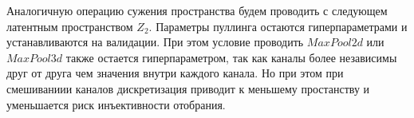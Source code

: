Аналогичную операцию сужения пространства будем проводить с следующем латентным пространством $Z_2$. Параметры пуллинга остаются гиперпараметрами и устанавливаются на валидации. При этом условие проводить $MaxPool2d$ или $MaxPool3d$ также остается гиперпараметром, так как каналы более независимы друг от друга чем значения внутри каждого канала. Но при этом при смешиваниии каналов дискретизация приводит к меньшему простанству и уменьшается риск инъективности отобрания. 




